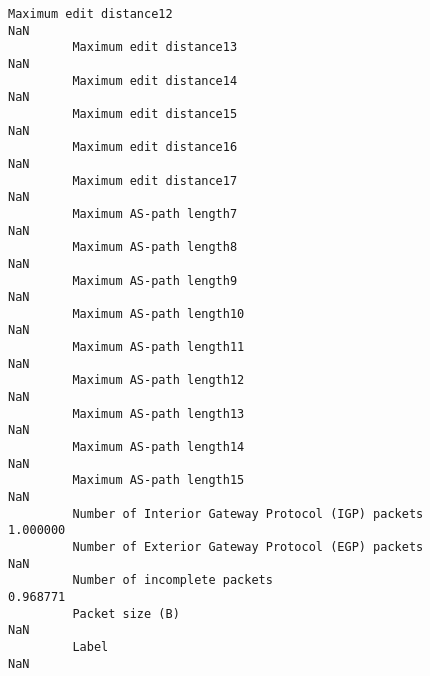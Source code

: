 \documentclass[11pt]{article}
\begin{document}
\begin{Verbatim}[commandchars=\\\{\}]
         Maximum edit distance12                                                                          NaN   
         Maximum edit distance13                                                                          NaN   
         Maximum edit distance14                                                                          NaN   
         Maximum edit distance15                                                                          NaN   
         Maximum edit distance16                                                                          NaN   
         Maximum edit distance17                                                                          NaN   
         Maximum AS-path length7                                                                          NaN   
         Maximum AS-path length8                                                                          NaN   
         Maximum AS-path length9                                                                          NaN   
         Maximum AS-path length10                                                                         NaN   
         Maximum AS-path length11                                                                         NaN   
         Maximum AS-path length12                                                                         NaN   
         Maximum AS-path length13                                                                         NaN   
         Maximum AS-path length14                                                                         NaN   
         Maximum AS-path length15                                                                         NaN   
         Number of Interior Gateway Protocol (IGP) packets                                           1.000000   
         Number of Exterior Gateway Protocol (EGP) packets                                                NaN   
         Number of incomplete packets                                                                0.968771   
         Packet size (B)                                                                                  NaN   
         Label                                                                                            NaN   
         

\end{Verbatim}
\end{document}
